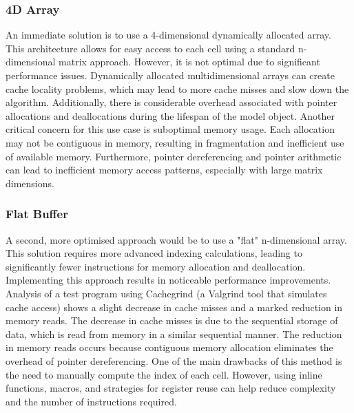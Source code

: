 \subsubsection{4D Array}\label{sec:4d_array}
An immediate solution is to use a 4-dimensional dynamically allocated array. This architecture allows for easy access to each cell using a standard n-dimensional matrix approach. However, it is not optimal due to significant performance issues.
Dynamically allocated multidimensional arrays can create cache locality problems, which may lead to more cache misses and slow down the algorithm. Additionally, there is considerable overhead associated with pointer allocations and deallocations during the lifespan of the model object.
Another critical concern for this use case is suboptimal memory usage. Each allocation may not be contiguous in memory, resulting in fragmentation and inefficient use of available memory. Furthermore, pointer dereferencing and pointer arithmetic can lead to inefficient memory access patterns, especially with large matrix dimensions.

\subsubsection{Flat Buffer}\label{sec:flat_buf}
A second, more optimised approach would be to use a "flat" n-dimensional array. This solution requires more advanced indexing calculations, leading to significantly fewer instructions for memory allocation and deallocation. Implementing this approach results in noticeable performance improvements. 
Analysis of a test program using Cachegrind (a Valgrind tool that simulates cache access) shows a slight decrease in cache misses and a marked reduction in memory reads. The decrease in cache misses is due to the sequential storage of data, which is read from memory in a similar sequential manner. The reduction in memory reads occurs because contiguous memory allocation eliminates the overhead of pointer dereferencing.
One of the main drawbacks of this method is the need to manually compute the index of each cell. However, using inline functions, macros, and strategies for register reuse can help reduce complexity and the number of instructions required.

